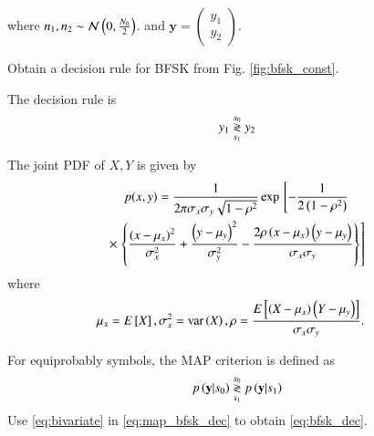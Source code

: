 \documentclass[journal,12pt,twocolumn]{IEEEtran}
\begin{document}
where $n_1,n_2 \sim \mathcal{N}\left(0,\frac{N_0}{2}\right)$. and
$
\mathbf{y} = 
\begin{pmatrix*}
y_{1}\\
 y_{2}
\end{pmatrix*}
$.
\begin{problem}
Obtain a decision rule for BFSK from Fig. \ref{fig:bfsk_const}.
\end{problem}
\solution The decision rule is
\begin{equation}
\label{eq:bfsk_dec}
y_1 \overset{s_0}{\underset{s_1}{\gtrless}} y_2
\end{equation}
\begin{definition}
The joint PDF of $X,Y$ is given by
\begin{multline}
\label{eq:bivariate}
p(x,y)= \frac{1}{2\pi \sigma_x\sigma_y\sqrt{1-\rho^2}}\exp{}\left[-\frac{1}{2\left(1-\rho^2\right)}\right.
\\
\times {}\left.\left\{\frac{\left(x-\mu_x\right)^2}{\sigma_x^2}+\frac{\left(y-\mu_y\right)^2}{\sigma_y^2}-\frac{2\rho\left(x-\mu_x\right)\left(y-\mu_y\right)}{\sigma_x\sigma_y}\right\}\right]
\end{multline}
%
where
\begin{align}
\mu_x &= E{}\left[X\right],
\sigma_x^2 = \text{var}\left(X\right),
\rho = \frac{E{}\left[\left(X - \mu_x\right)\left(Y-\mu_y\right)\right]}{\sigma_x\sigma_y}.
\end{align}
%
\end{definition}
%
\begin{problem}
For equiprobably symbols, the MAP criterion is defined as
%
\begin{equation}
\label{eq:map_bfsk_dec}
p\left(\mathbf{y}|s_0\right) \overset{s_0}{\underset{s_1}{\gtrless}} p\left(\mathbf{y}|s_1\right)
\end{equation}
Use \eqref{eq:bivariate} in \eqref{eq:map_bfsk_dec}  to obtain \eqref{eq:bfsk_dec}.
\end{problem}
\end{document}
